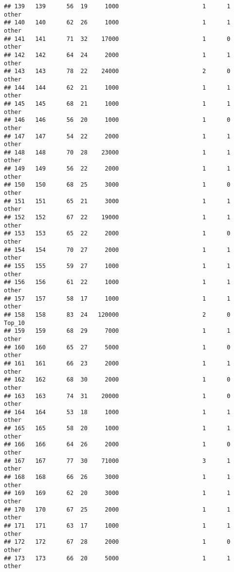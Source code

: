 \documentclass[
]{article}
\begin{document}
\begin{verbatim}
## 139   139      56  19     1000                        1      1    other
## 140   140      62  26     1000                        1      1    other
## 141   141      71  32    17000                        1      0    other
## 142   142      64  24     2000                        1      1    other
## 143   143      78  22    24000                        2      0    other
## 144   144      62  21     1000                        1      1    other
## 145   145      68  21     1000                        1      1    other
## 146   146      56  20     1000                        1      0    other
## 147   147      54  22     2000                        1      1    other
## 148   148      70  28    23000                        1      1    other
## 149   149      56  22     2000                        1      1    other
## 150   150      68  25     3000                        1      0    other
## 151   151      65  21     3000                        1      1    other
## 152   152      67  22    19000                        1      1    other
## 153   153      65  22     2000                        1      0    other
## 154   154      70  27     2000                        1      1    other
## 155   155      59  27     1000                        1      1    other
## 156   156      61  22     1000                        1      1    other
## 157   157      58  17     1000                        1      1    other
## 158   158      83  24   120000                        2      0   Top_10
## 159   159      68  29     7000                        1      1    other
## 160   160      65  27     5000                        1      0    other
## 161   161      66  23     2000                        1      1    other
## 162   162      68  30     2000                        1      0    other
## 163   163      74  31    20000                        1      0    other
## 164   164      53  18     1000                        1      1    other
## 165   165      58  20     1000                        1      1    other
## 166   166      64  26     2000                        1      0    other
## 167   167      77  30    71000                        3      1    other
## 168   168      66  26     3000                        1      1    other
## 169   169      62  20     3000                        1      1    other
## 170   170      67  25     2000                        1      1    other
## 171   171      63  17     1000                        1      1    other
## 172   172      67  28     2000                        1      0    other
## 173   173      66  20     5000                        1      1    other

\end{verbatim}
\end{document}
